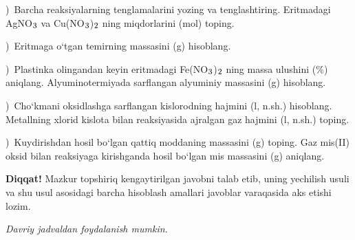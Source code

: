 \documentclass[11pt,a4paper]{article}
\renewcommand{\textsubscript}[1]{\ensuremath{_{\text{\fontsize{8}{8}\selectfont #1}}}}
\newcommand{\qsep}{\par\vspace{13pt}}
\newcommand{\diqqat}[1]{\par\smallskip\noindent\textbf{Diqqat!} #1\par\medskip}
\newcommand{\hdrpill}[1]{\begin{tikzpicture}[baseline=0pt]\node[fill=ygreen,text=white,rounded corners=8pt,inner xsep=10pt,inner ysep=5pt,font=\fontsize{13}{15}\bfseries\selectfont] at (0,0.475){#1};\end{tikzpicture}}
\newcommand{\curvar}{}\fancyhead[R]{\hdrpill{\curvar}}
\begin{document}
)\ Barcha reaksiyalarning tenglamalarini yozing va tenglashtiring. Eritmadagi AgNO\textsubscript{3} va Cu(NO\textsubscript{3})\textsubscript{2} ning miqdorlarini (mol) toping.\par
{})\ Eritmaga o`tgan temirning massasini (g) hisoblang.\par
{})\ Plastinka olingandan keyin eritmadagi Fe(NO\textsubscript{3})\textsubscript{2} ning massa ulushini (\%) aniqlang. Alyuminotermiyada sarflangan alyuminiy massasini (g) hisoblang.\par
{})\ Cho`kmani oksidlashga sarflangan kislorodning hajmini (l, n.sh.) hisoblang. Metallning xlorid kislota bilan reaksiyasida ajralgan gaz hajmini (l, n.sh.) toping.\par
{})\ Kuydirishdan hosil bo`lgan qattiq moddaning massasini (g) toping. Gaz mis(II) oksid bilan reaksiyaga kirishganda hosil bo`lgan mis massasini (g) aniqlang.\par
\diqqat{Mazkur topshiriq kengaytirilgan javobni talab etib, uning yechilish usuli va shu usul asosidagi barcha hisoblash amallari javoblar varaqasida aks etishi lozim.}\qsep
\newpage
\renewcommand{\curvar}{10-variant}
\thispagestyle{first}
\noindent\textit{Davriy jadvaldan foydalanish mumkin.}
\par\smallskip
\end{document}
